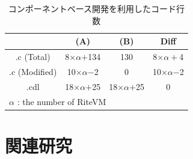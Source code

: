 \documentclass[submit,techrep]{ipsj}
\begin{document}
\begin{table}[t]
    \centering
    \caption{コンポーネントベース開発を利用したコード行数} 
    \begin{tabular}{c||cc|c}
                & (A)       & (B)     & Diff  \\ \hline
        .c (Total)      & 8$\times$$\alpha$$+$134  & 130     & 8$\times$$\alpha+$4\\
        .c (Modified)   & 10$\times\alpha$$-$2 & 0   &  10$\times\alpha$$-$2 \\
        .cdl    & 18$\times$$\alpha$$+$25   & 18$\times$$\alpha$$+$25 & 0     \\
        \multicolumn{3}{l}{{\small $\alpha$} : {\scriptsize the number of RiteVM}}
    \end{tabular}
    \vspace{-3mm}
    \label{tab:codesize}
\end{table}

\section{関連研究}
\vspace{-2mm}
\label{sec:Related Work}
\end{document}

